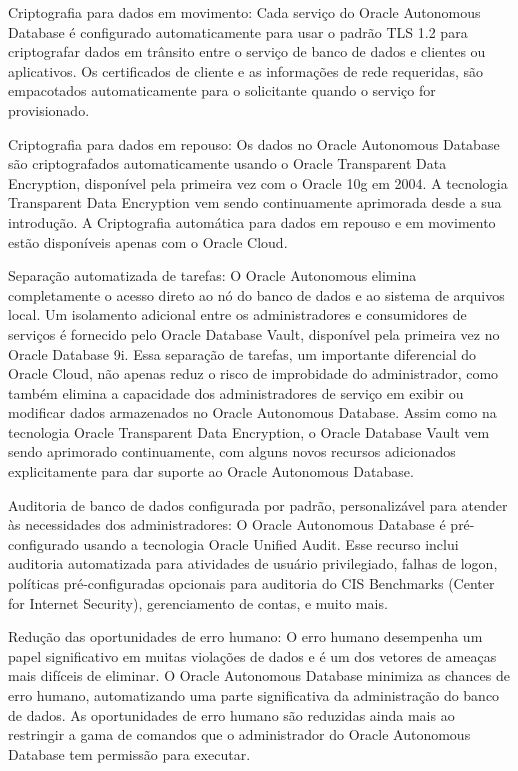 \begin{alineas} 
\item Criptografia para dados em movimento:  Cada serviço do Oracle Autonomous Database é configurado automaticamente para usar o padrão TLS 1.2 para criptografar dados em trânsito entre o serviço de banco de dados e clientes ou aplicativos. Os certificados de cliente e as informações de rede requeridas, são empacotados automaticamente para o solicitante quando o serviço for provisionado.

\item Criptografia para dados em repouso: Os dados no Oracle Autonomous Database são criptografados automaticamente usando o Oracle Transparent Data Encryption, disponível pela primeira vez com o Oracle 10g em 2004. A tecnologia Transparent Data Encryption vem sendo continuamente aprimorada desde a sua introdução. A Criptografia automática para dados em repouso e em movimento estão disponíveis apenas com o Oracle Cloud.

\item Separação automatizada de tarefas: O Oracle Autonomous elimina completamente o acesso direto ao nó do banco de dados e ao sistema de arquivos local. Um isolamento adicional entre os administradores e consumidores de serviços é fornecido pelo Oracle Database Vault, disponível pela primeira vez no Oracle Database 9i. Essa separação de tarefas, um importante diferencial do Oracle Cloud, não apenas reduz o risco de improbidade do administrador, como também elimina a capacidade dos administradores de serviço em exibir ou modificar dados armazenados no Oracle Autonomous Database. Assim como na tecnologia Oracle Transparent Data Encryption, o Oracle Database Vault vem sendo  aprimorado continuamente, com alguns novos recursos adicionados explicitamente para dar suporte ao Oracle Autonomous Database.

\item Auditoria de banco de dados configurada por padrão, personalizável para atender às necessidades dos administradores: O Oracle Autonomous Database é pré-configurado usando a tecnologia Oracle Unified Audit. Esse recurso inclui auditoria automatizada para atividades de usuário privilegiado, falhas de logon, políticas pré-configuradas opcionais para auditoria do CIS Benchmarks (Center for Internet Security), gerenciamento de contas, e muito mais.

\item Redução das oportunidades de erro humano: O erro humano desempenha um papel significativo em muitas violações de dados e é um dos vetores de ameaças mais difíceis de eliminar. O Oracle Autonomous Database minimiza as chances de erro humano, automatizando uma parte significativa da administração do banco de dados. As oportunidades de erro humano são reduzidas ainda mais ao restringir a gama de comandos que o administrador do Oracle Autonomous Database tem permissão para executar.


\end{alineas}
